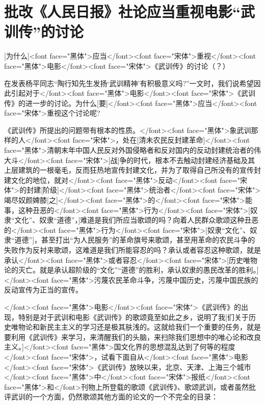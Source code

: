 \section[批改《人民日报》社论应当重视电影“武训传”的讨论（一九五一年五月二十日）]{批改《人民日报》社论应当重视电影“武训传”的讨论}


[为什么]<font face="黑体">应当</font><font face="宋体">重视</font><font face="黑体">电影</font><font face="宋体">《武训传》的讨论（？）

在发表杨平同志“陶行知先生发扬‘武训精神’有积极意义吗?”一文时，我们说希望因此引起对于</font><font face="黑体">电影</font><font face="宋体">《武训传》的进一步的讨论。为什么[要]</font><font face="黑体">应当</font><font face="宋体">重视这个讨论呢?

《武训传》所提出的问题带有根本的性质。</font><font face="黑体">象武训那样的人</font><font face="宋体">，处在[清未农民反封建革命]</font><font face="黑体">清朝末年中国人民反对外国侵略者和反对国内的反动封建统治者的伟大斗</font><font face="宋体">[战]争的时代，根本不去触动封建经济基础及其上层建筑的一根毫毛，反而狂热地宣传封建文化，并为了取得自己所没有的宣传封建文化的地位，就对</font><font face="黑体">反动</font><font face="宋体">的封建[阶级]</font><font face="黑体">统治者</font><font face="宋体">竭尽奴颜婢膝[之]</font><font face="黑体">的</font><font face="宋体">能事，这种丑恶的</font><font face="黑体">行为</font><font face="宋体">[奴隶“文化”、奴隶“道德”，]难道是我们所应当歌颂的吗？向着人民群众歌颂这种丑恶的</font><font face="黑体">行为</font><font face="宋体">[奴隶“文化”、奴隶“道德”]，甚至打出“为人民服务”的革命旗号来歌颂，甚至用革命的农民斗争的失败作为反衬来歌颂，这难道是我们所能容忍的吗？承认或者容忍这种歌颂，就是承认</font><font face="黑体">或者容忍</font><font face="宋体">[历史唯物论的灭亡。就是承认超阶级的“文化”“道德”的胜利，承认奴隶的愚民改革的胜利。]</font><font face="黑体">污蔑农民革命斗争，污蔑中国历史，污蔑中国民族的反动宣传为正当的宣传。

</font><font face="黑体">电影</font><font face="宋体">《武训传》的出现，特别是对于武训和电影《武训传》的歌颂竟至如此之乡，说明了我[们关于历史唯物论和新民主主义的学习还是极其肤浅的。这就给我们一个重要的任务，就是要利用《武训传》来学习，来清醒我们的头脑，来扫除我们思想中的唯心论和改良主义。]</font><font face="黑体">国文化界的思想混乱达到了何等的程度</font><font face="宋体">，试看下面自从</font><font face="黑体">电影</font><font face="宋体">《武训传》放映以来，北京、天津、上海三个城市</font><font face="黑体">中</font><font face="宋体">报纸</font><font face="黑体">和</font>刊物上所登载的歌颂《武训传》、歌颂武训，或者虽然批评武训的一个方面，仍然歌颂其他方面的论文的一个不完全的目录：

